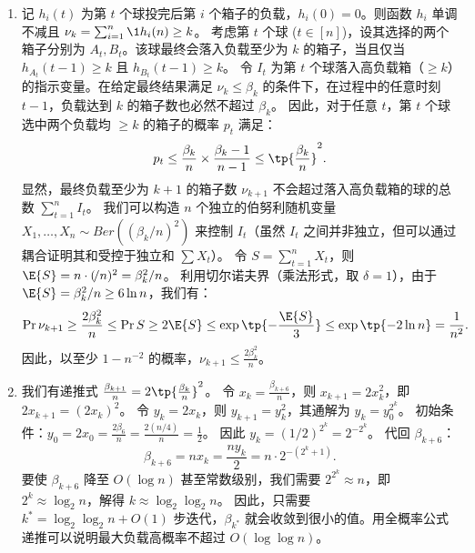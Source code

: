 \begin{solution}
    \begin{enumerate}
        \item 记 $h_i(t)$ 为第 $t$ 个球投完后第 $i$ 个箱子的负载，$h_i(0)=0$。则函数 $h_i$ 单调不减且 $\nu_k = \sum_{i=1}^n \1{h_i(n) \ge k}$。
        考虑第 $t$ 个球 ($t \in [n]$)，设其选择的两个箱子分别为 $A_t, B_t$。该球最终会落入负载至少为 $k$ 的箱子，当且仅当 $h_{A_t}(t-1) \ge k$ 且 $h_{B_t}(t-1) \ge k$。
        令 $I_t$ 为第 $t$ 个球落入高负载箱（$\ge k$）的指示变量。在给定最终结果满足 $\nu_k \le \beta_k$ 的条件下，在过程中的任意时刻 $t-1$，负载达到 $k$ 的箱子数也必然不超过 $\beta_k$。
        因此，对于任意 $t$，第 $t$ 个球选中两个负载均 $\ge k$ 的箱子的概率 $p_t$ 满足：
        \[
             p_t \le \frac{\beta_k}{n} \times \frac{\beta_k - 1}{n - 1} \le \tp{\frac{\beta_k}{n}}^2.
        \]
        显然，最终负载至少为 $k+1$ 的箱子数 $\nu_{k+1}$ 不会超过落入高负载箱的球的总数 $\sum_{t=1}^n I_t$。
        我们可以构造 $n$ 个独立的伯努利随机变量 $X_1, \dots, X_n \sim \!{Ber}((\beta_k/n)^2)$ 来控制 $I_t$（虽然 $I_t$ 之间并非独立，但可以通过耦合证明其和受控于独立和 $\sum X_t$）。
        令 $S = \sum_{t=1}^n X_t$，则 $\E{S} = n \cdot (\!/n)^2 = \beta_k^2/n$。
        利用切尔诺夫界（乘法形式，取 $\delta=1$），由于 $\E{S} = \beta_k^2/n \ge 6\ln n$，我们有：
        \[
            \Pr{\nu_{k+1} \ge \frac{2\beta_k^2}{n}} \le \Pr{S \ge 2\E{S}} \le \exp\tp{-\frac{\E{S}}{3}} \le \exp\tp{-2\ln n} = \frac{1}{n^2}.
        \]
        因此，以至少 $1 - n^{-2}$ 的概率，$\nu_{k+1} \le \frac{2\beta_k^2}{n}$。

        \item 我们有递推式 $\frac{\beta_{k+1}}{n} = 2 \tp{\frac{\beta_k}{n}}^2$。
        令 $x_k = \frac{\beta_{k+6}}{n}$，则 $x_{k+1} = 2 x_k^2$，即 $2x_{k+1} = (2x_k)^2$。
        令 $y_k = 2x_k$，则 $y_{k+1} = y_k^2$，其通解为 $y_k = y_0^{2^k}$。
        初始条件：$y_0 = 2x_0 = \frac{2\beta_6}{n} = \frac{2(n/4)}{n} = \frac{1}{2}$。
        因此 $y_k = (1/2)^{2^k} = 2^{-2^k}$。
        代回 $\beta_{k+6}$：
        \[
            \beta_{k+6} = n x_k = \frac{n y_k}{2} = n \cdot 2^{-(2^k + 1)}.
        \]
        要使 $\beta_{k+6}$ 降至 $O(\log n)$ 甚至常数级别，我们需要 $2^{2^k} \approx n$，即 $2^k \approx \log_2 n$，解得 $k \approx \log_2 \log_2 n$。
        因此，只需要 $k^* = \log_2 \log_2 n + O(1)$ 步迭代，$\beta_{k^*}$ 就会收敛到很小的值。用全概率公式递推可以说明最大负载高概率不超过 $O(\log \log n)$。
    \end{enumerate}
\end{solution}

